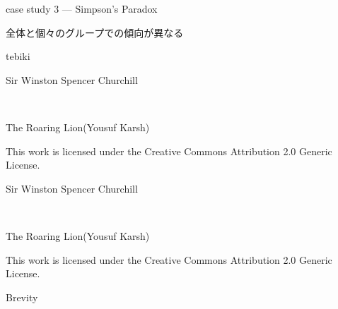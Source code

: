 \documentclass[
  ignorenonframetext,
]{beamer}
\begin{document}
\begin{frame}{case study 3 --- Simpson's Paradox}
\protect\hypertarget{case-study-3-simpsons-paradox}{}
\LARGE

全体と個々のグループでの傾向が異なる

\normalsize
\end{frame}

\begin{frame}{tebiki}
\protect\hypertarget{tebiki}{}
\vspace*{-20pt}
\end{frame}

\begin{frame}{Sir Winston Spencer Churchill}
\protect\hypertarget{sir-winston-spencer-churchill}{}
\raggedleft\Huge


\tiny

\raggedleft

The Roaring Lion(Yousuf Karsh) \vspace{-5pt}

This work is licensed under the Creative Commons Attribution 2.0 Generic
License.
\end{frame}

\begin{frame}{Sir Winston Spencer Churchill}
\protect\hypertarget{sir-winston-spencer-churchill-1}{}
\raggedleft\Huge


\tiny

\raggedleft

The Roaring Lion(Yousuf Karsh) \vspace{-5pt}

This work is licensed under the Creative Commons Attribution 2.0 Generic
License.
\end{frame}

\begin{frame}{Brevity}
\protect\hypertarget{brevity}{}
\centering
\vspace*{-21.5pt}
\end{frame}
\end{document}
